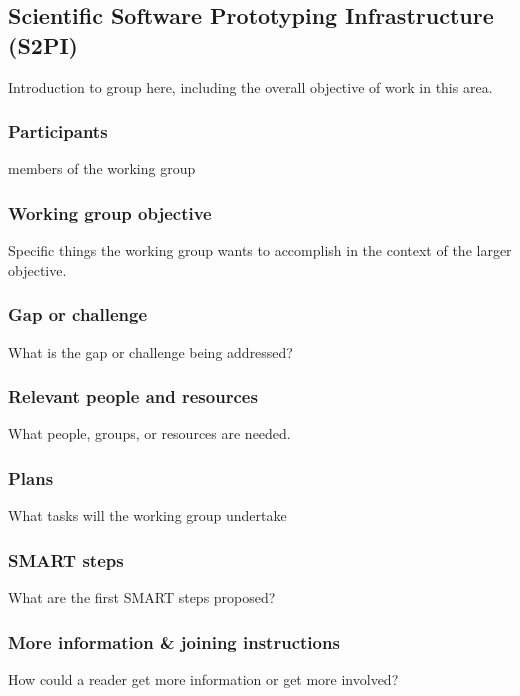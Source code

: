 \subsection{Scientific Software Prototyping Infrastructure (S2PI)}
\label{sec:prototyping}


Introduction to group here, including the overall objective of work in this area.

\subsubsection{Participants}

members of the working group

\subsubsection{Working group objective}

Specific things the working group wants to accomplish in the context of the larger objective.

\subsubsection{Gap or challenge}

What is the gap or challenge being addressed?

\subsubsection{Relevant people and resources}

What people, groups, or resources are needed.

\subsubsection{Plans}

What tasks will the working group undertake

\subsubsection{SMART steps}

What are the first SMART steps proposed?

\subsubsection{More information \& joining instructions}

How could a reader get more information or get more involved?
